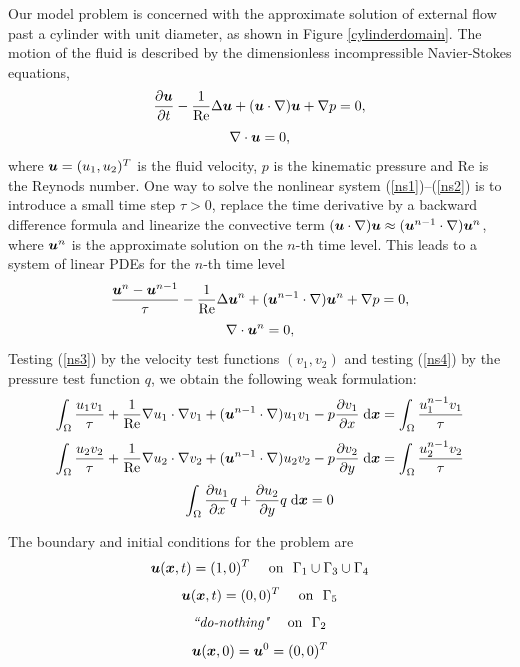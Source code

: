 Our model problem is concerned with the approximate solution of external flow past
a cylinder with unit diameter, as shown in Figure \ref{cylinderdomain}. The motion of the
fluid is described by the dimensionless incompressible Navier-Stokes equations,
\begin{equation} \label{ns1}
  \frac{\partial \mbox{\boldmath $u$}}{\partial t} - \frac{1}{\rm Re} \Delta \mbox{\boldmath $u$} + (\mbox{\boldmath $u$} \cdot \nabla) \mbox{\boldmath $u$} + \nabla p  = 0,
\end{equation}
\begin{equation} \label{ns2}
  \nabla \cdot \mbox{\boldmath $u$} = 0,
\end{equation}
where $\mbox{\boldmath $u$} = (u_1, u_2)^T$ is the fluid velocity, $p$ is the kinematic pressure and Re
is the Reynods number. One way to solve the nonlinear system (\ref{ns1})--(\ref{ns2}) is to
introduce a small time step $\tau > 0$, replace the time derivative by a backward
difference formula and linearize the convective term
$(\mbox{\boldmath $u$} \cdot \nabla) \mbox{\boldmath $u$} \approx (\mbox{\boldmath $u$}^{n-1} \cdot \nabla) \mbox{\boldmath $u$}^n$, where $\mbox{\boldmath $u$}^n$ is the
approximate solution on the $n$-th time level. This leads to a system of linear PDEs for the
$n$-th time level
\begin{equation} \label{ns3}
  \frac{\mbox{\boldmath $u$}^n - \mbox{\boldmath $u$}^{n-1}}{\tau} - \frac{1}{\rm Re} \Delta \mbox{\boldmath $u$}^n + 
    (\mbox{\boldmath $u$}^{n-1} \cdot \nabla) \mbox{\boldmath $u$}^n + \nabla p  = 0,
\end{equation}
\begin{equation} \label{ns4}
  \nabla \cdot \mbox{\boldmath $u$}^n = 0,
\end{equation}
Testing (\ref{ns3}) by the velocity test functions $(v_1, v_2)$ and testing (\ref{ns4})
by the pressure test function $q$, we obtain the following weak formulation:
$$\int_\Omega \frac{u_1 v_1}{\tau} +
  \frac{1}{\rm Re} \nabla u_1 \cdot \nabla v_1 +
  (\mbox{\boldmath $u$}^{n-1} \cdot \nabla) u_1 v_1 - p \frac{\partial v_1}{\partial x} \;\mbox{d}\mbox{\boldmath $x$}
  = \int_\Omega \frac{u^{n-1}_1 v_1}{\tau} $$
$$\int_\Omega \frac{u_2 v_2}{\tau} +
  \frac{1}{\rm Re} \nabla u_2 \cdot \nabla v_2 +
  (\mbox{\boldmath $u$}^{n-1} \cdot \nabla) u_2 v_2 - p \frac{\partial v_2}{\partial y} \;\mbox{d}\mbox{\boldmath $x$}
  = \int_\Omega \frac{u^{n-1}_2 v_2}{\tau} $$
$$\int_\Omega \frac{\partial u_1}{\partial x} q + \frac{\partial u_2}{\partial y} q \;\mbox{d}\mbox{\boldmath $x$} = 0 $$

The boundary and initial conditions  for the problem are
$$\bfu(\bfx, t) = (1, 0)^T \ \ \ \ \mbox{on}\ \ \Gamma_1 \cup \Gamma_3 \cup \Gamma_4$$
$$\bfu(\bfx, t) = (0, 0)^T \ \ \ \ \mbox{on}\ \ \Gamma_5$$
$$\mbox{\it ``do-nothing"}\ \ \ \ \mbox{on}\ \ \Gamma_2$$
\begin{equation} \mbox{\boldmath $u$}(\mbox{\boldmath $x$}, 0) = \mbox{\boldmath $u$}^0 = (0, 0)^T \label{ns:initial} \end{equation}

